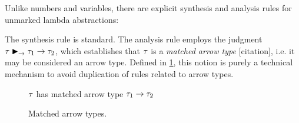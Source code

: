 Unlike numbers and variables, there are explicit synthesis and analysis rules for unmarked lambda
abstractions: %
%
\begin{mathpar}

\end{mathpar}
%
The synthesis rule is standard. The analysis rule employs the judgment
$\matchedArrow{\TMV}{\TMV_1}{\TMV_2}$, which establishes that $\TMV$ is a \emph{matched arrow type}
[citation], i.e. it may be considered an arrow type. Defined in \cref{fig:calculus-matched-arrow},
this notion is purely a technical mechanism to avoid duplication of rules related to arrow types.


\begin{figure}[htbp]
  \raggedright
   $\TMV$ has matched arrow type $\TArrow{\TMV_1}{\TMV_2}$
  \begin{mathpar}

  \end{mathpar}
  \caption{Matched arrow types.}
  \label{fig:calculus-matched-arrow}
\end{figure}

